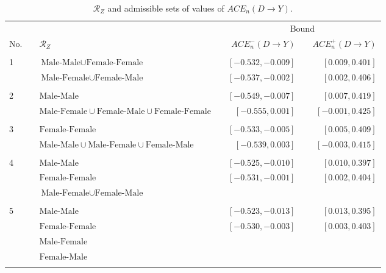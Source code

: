 \documentclass[12pt,a4paper,twoside]{article}
\renewcommand{\baselinestretch}{1.5}
\numberwithin{equation}{section}
\begin{document}
\clearpage
\renewcommand{\baselinestretch}{1}
\begin{sidewaystable}[p]
\centering
\caption{$\mathcal{R}_Z$ and admissible sets of values of $ACE_n(D\rightarrow Y)$.}
\begin{tabular}{lclcrcr}
\toprule
&	&  & &\multicolumn{3}{c}{Bound} \\
\cmidrule(r){4-7}	
No.& &	$\mathcal{R}_Z$	&	&	$ACE_n^-(D\rightarrow Y)$	&	&	$ACE_n^+(D\rightarrow Y)$\\
\midrule
& &\phantom{$\text{Male-Female}\cup\text{Female-Male}\cup\text{Female-Female}$}\\
1& &$\text{Male-Male}\cup\text{Female-Female}$	&	&	$[-0.532,-0.009]$	&	&	$[0.009,0.401]$	\\
& &$\text{Male-Female}\cup\text{Female-Male}$	&	&	\color{blue}$[-0.537,-0.002]$	&	&	\color{blue}$[0.002,0.406]$	\\
\\
2& &$\text{Male-Male}$	&	&	$[-0.549,-0.007]$	&	&	$[0.007,0.419]$	\\
& &$\text{Male-Female}\cup\text{Female-Male}\cup\text{Female-Female}$	&	&	\color{blue}$[-0.555,0.001]$	&	&	\color{blue}$[-0.001,0.425]$\\
\\
3& &$\text{Female-Female}$	&	&	$[-0.533,-0.005]$	&	&	$[0.005,0.409]$	\\
& &$\text{Male-Male}\cup\text{Male-Female}\cup\text{Female-Male}$	& &\color{blue}$[-0.539,0.003]$	&	&	\color{blue}$[-0.003,0.415]$\\	
\\
4& &$\text{Male-Male}$&	&	$[-0.525,-0.010]$	&	&	$[0.010,0.397]$	\\
& &$\text{Female-Female}$ & &\color{blue}$[-0.531,-0.001]$	&	&	\color{blue}$[0.002,0.404]$\\
& &$\text{Male-Female}\cup\text{Female-Male}$\\	
\\
5& &$\text{Male-Male}$&	&	$[-0.523,-0.013]$	&	&	$[0.013,0.395]$	\\
& &$\text{Female-Female}$& &\color{blue}$[-0.530,-0.003]$	&	&	\color{blue}$[0.003,0.403]$	\\
& &$\text{Male-Female}$ \\
& &$\text{Female-Male}$\\	
	\\
\bottomrule
\end{tabular}
\vspace{10pt}
\renewcommand{\baselinestretch}{1.5}

\end{sidewaystable}
\end{document}
